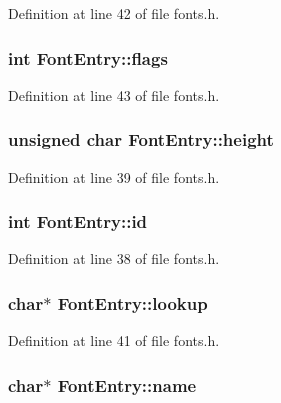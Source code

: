 Definition at line 42 of file fonts.\-h.

\hypertarget{struct_font_entry_ac303d26271189d7316a5be25645a015a}{
\subsubsection[{flags}]{\setlength{\rightskip}{0pt plus 5cm}int Font\-Entry\-::flags}}\label{struct_font_entry_ac303d26271189d7316a5be25645a015a}


Definition at line 43 of file fonts.\-h.

\hypertarget{struct_font_entry_a681f3a165ad4cdebceacd154f1010496}{
\subsubsection[{height}]{\setlength{\rightskip}{0pt plus 5cm}unsigned char Font\-Entry\-::height}}\label{struct_font_entry_a681f3a165ad4cdebceacd154f1010496}


Definition at line 39 of file fonts.\-h.

\hypertarget{struct_font_entry_aac1e71224e2b29501fd49cb55c286a8c}{
\subsubsection[{id}]{\setlength{\rightskip}{0pt plus 5cm}int Font\-Entry\-::id}}\label{struct_font_entry_aac1e71224e2b29501fd49cb55c286a8c}


Definition at line 38 of file fonts.\-h.

\hypertarget{struct_font_entry_ac5988218ea6cd3b134490c1426c8507f}{
\subsubsection[{lookup}]{ char$\ast$ Font\-Entry\-::lookup}}\label{struct_font_entry_ac5988218ea6cd3b134490c1426c8507f}


Definition at line 41 of file fonts.\-h.

\hypertarget{struct_font_entry_ab835f13c463a408a4ed2a8a071b89933}{
\subsubsection[{name}]{ char$\ast$ Font\-Entry\-::name}}\label{struct_font_entry_ab835f13c463a408a4ed2a8a071b89933}


